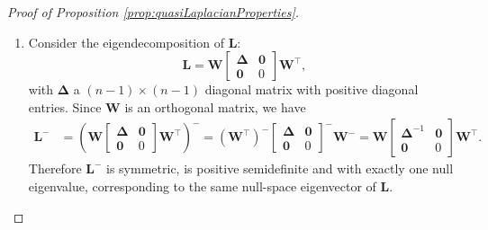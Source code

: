 \documentclass[12pt]{article}
\theoremstyle{plain}
\theoremstyle{remark}
\newcommand{\round}[1]{\left( #1 \right)}
\newcommand{\dVec}[1]{{\bm{#1}}}            %
\newcommand{\latMatr}[1]{\mathbf{#1}}          %
\newcommand{\grMatr}[1]{{\boldsymbol{#1}}}   %
\begin{document}
\begin{proof}[Proof of Proposition \ref{prop:quasiLaplacianProperties}]
\begin{enumerate}
\begin{align*}
            \end{align*}
            \item Consider the eigendecomposition of $\latMatr L$: \begin{equation}
            \label{eq:eigL1}
                {\latMatr{L}}=\latMatr W \begin{bmatrix}
                    \grMatr{\Delta} & \dVec 0\\
                    \dVec 0 & 0
                \end{bmatrix} \latMatr W^\top,
            \end{equation}
            with $\grMatr{\Delta}$ a $(n-1) \times (n-1)$ diagonal matrix with positive diagonal entries.
            Since $\latMatr W$ is an orthogonal matrix, we have 
            \begin{equation}
                \label{eq:eigL2}
                \begin{split}
                    {\latMatr{L}}^-&=\round{\latMatr W \begin{bmatrix}
                        \grMatr{\Delta} & \dVec 0\\
                        \dVec 0 & 0
                    \end{bmatrix} \latMatr W^\top}^-=(\latMatr W^\top)^-\begin{bmatrix}
                        \grMatr{\Delta} & \dVec 0\\
                        \dVec 0 & 0
                    \end{bmatrix}^- \latMatr W^-=\latMatr W\begin{bmatrix}
                        \grMatr{\Delta}^{-1} & \dVec 0\\
                        \dVec 0 & 0
                    \end{bmatrix} \latMatr W^\top.
                \end{split}
            \end{equation}
            Therefore ${\latMatr{L}}^-$ is symmetric, is positive semidefinite and with exactly one null eigenvalue, corresponding to the same null-space eigenvector of $\latMatr L$.
        \end{enumerate}
    \end{proof}
    
\end{document}
